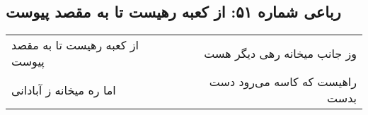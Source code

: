\begin{center}
\section*{رباعی شماره ۵۱: از کعبه رهیست تا به مقصد پیوست}
\label{sec:sh051}
\begin{longtable}{l p{0.5cm} r}
از کعبه رهیست تا به مقصد پیوست
&&
وز جانب میخانه رهی دیگر هست
\\
اما ره میخانه ز آبادانی
&&
راهیست که کاسه می‌رود دست بدست
\\
\end{longtable}
\end{center}
